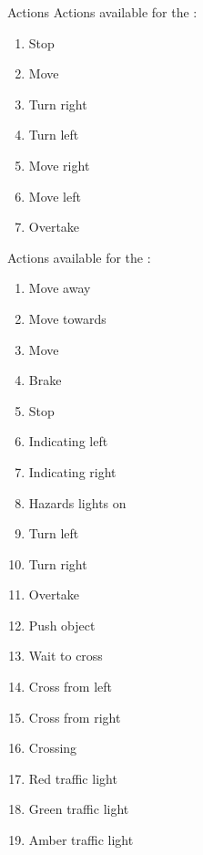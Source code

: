 \documentclass[10pt, aspectratio=169]{beamer}
\begin{document}
\begin{frame}{Actions}
Actions available for the :
  \begin{multicols}{4}
        \begin{enumerate}
            \setlength\itemsep{0.4em}
            \item Stop
            \item Move
            \item Turn right
            \item Turn left
            \item Move right
            \item Move left
            \item Overtake
        \end{enumerate}
    \end{multicols}
Actions available for the :
  \begin{multicols}{4}
        \begin{enumerate}
            \setlength\itemsep{0.4em}
            \item Move away
            \item Move towards
            \item Move
            \item Brake
            \item Stop
            \item Indicating left
            \item Indicating right
            \item Hazards lights on
            \item Turn left
            \item Turn right
            \item Overtake
            \item Push object
            \item Wait to cross
            \item Cross from left
            \item Cross from right
            \item Crossing
            \item Red traffic light
            \item Green traffic light
            \item Amber traffic light
        \end{enumerate}
    \end{multicols}
\end{frame}
\end{document}
